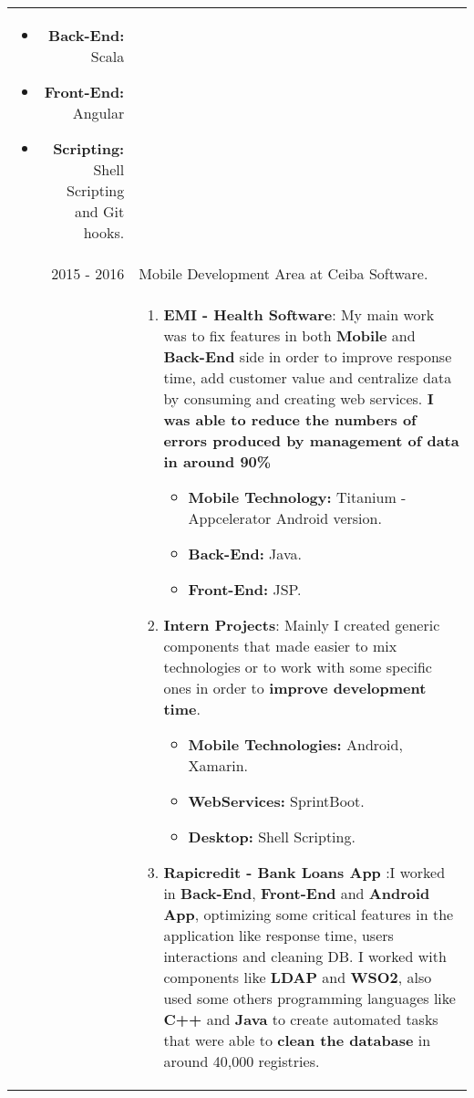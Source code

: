 \documentclass[a4paper,10pt]{article} %
\begin{document}
\begin{tabular}{r|p{11cm}}
{\begin{itemize}
\item \textbf{Back-End:} Scala
\item \textbf{Front-End:} Angular
\item \textbf{Scripting:} Shell Scripting and Git hooks.
\end{itemize}}\\
\textsc{2015 - 2016} & Mobile Development Area at Ceiba Software.\\
& \footnotesize{
\begin{enumerate}
\item \textbf{EMI - Health Software}: My main work was to fix features in both \textbf{Mobile} and \textbf{Back-End} side in order to improve response time, add customer value and centralize data by consuming and creating web services. \textbf{I was able to reduce the numbers of errors produced by management of data in around 90\%} \linebreak
\begin{itemize}
\item \textbf{Mobile Technology:} Titanium - Appcelerator Android version.
\item \textbf{Back-End:} Java.
\item \textbf{Front-End:} JSP.
\end{itemize}
\item \textbf{Intern Projects}: Mainly I created generic components that made easier to mix technologies or to work with some specific ones in order to \textbf{improve development time}. \linebreak
\begin{itemize}
\item \textbf{Mobile Technologies:} Android, Xamarin.
\item \textbf{WebServices:} SprintBoot.
\item \textbf{Desktop:} Shell Scripting.
\end{itemize}
\item \textbf{Rapicredit  - Bank Loans App} :I worked in \textbf{Back-End}, \textbf{Front-End} and \textbf{Android App}, optimizing some critical features in the application like response time, users interactions and cleaning DB. I worked with components like \textbf{LDAP} and \textbf{WSO2}, also used some others programming languages like \textbf{C++} and \textbf{Java} to create automated tasks that were able to \textbf{clean the database} in around 40,000 registries. \linebreak
\begin{itemize}

\end{itemize}
\end{enumerate}}
\end{tabular}
\end{document}
